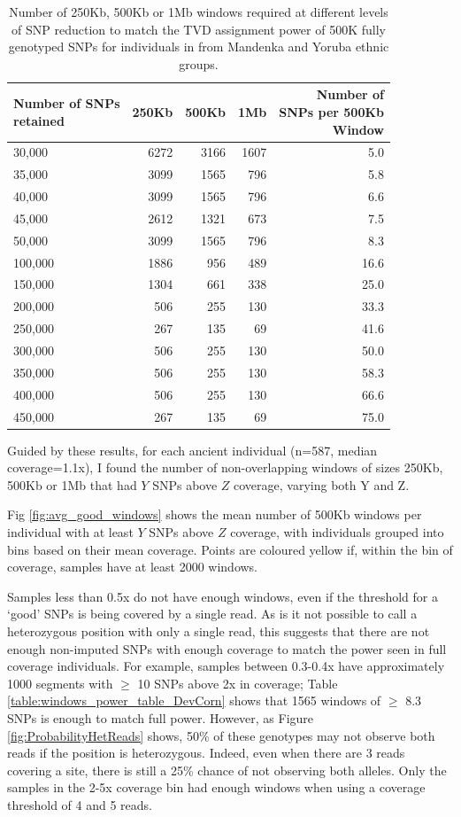 {\begin{table}
\centering
\begin{tabular}[t]{lrrrr}
\toprule
\thead{Number of SNPs\\ retained} & 250Kb & 500Kb & 1Mb & \thead{Number of\\ SNPs per 500Kb \\Window}\\
\midrule
30,000 & 6272 & 3166 & 1607 & 5.0\\
35,000 & 3099 & 1565 & 796 & 5.8\\
40,000 & 3099 & 1565 & 796 & 6.6\\
45,000 & 2612 & 1321 & 673 & 7.5\\
50,000 & 3099 & 1565 & 796 & 8.3\\
100,000 & 1886 & 956 & 489 & 16.6\\
150,000 & 1304 & 661 & 338 & 25.0\\
200,000 & 506 & 255 & 130 & 33.3\\
250,000 & 267 & 135 & 69 & 41.6\\
300,000 & 506 & 255 & 130 & 50.0\\
350,000 & 506 & 255 & 130 & 58.3\\
400,000 & 506 & 255 & 130 & 66.6\\
450,000 & 267 & 135 & 69 & 75.0\\
\bottomrule
\end{tabular}
\caption{Number of 250Kb, 500Kb or 1Mb windows required at different levels of SNP reduction to match the TVD assignment power of 500K fully genotyped SNPs for individuals in from Mandenka and Yoruba ethnic groups.}
\label{table:windows_power_table_ManYor}
\end{table}

Guided by these results, for each ancient individual (n=587, median coverage=1.1x), I found the number of non-overlapping windows of sizes 250Kb, 500Kb or 1Mb that had $Y$ SNPs above $Z$ coverage, varying both Y and Z. 

Fig \ref{fig:avg_good_windows} shows the mean number of 500Kb windows per individual with at least $Y$ SNPs above $Z$ coverage, with individuals grouped into bins based on their mean coverage. Points are coloured yellow if, within the bin of coverage, samples have at least 2000 windows.

Samples less than 0.5x do not have enough windows, even if the threshold for a `good' SNPs is being covered by a single read. As is it not possible to call a heterozygous position with only a single read, this suggests that there are not enough non-imputed SNPs with enough coverage to match the power seen in full coverage individuals. For example, samples between 0.3-0.4x have approximately 1000 segments with $\geq$ 10 SNPs above 2x in coverage; Table \ref{table:windows_power_table_DevCorn} shows that 1565 windows of $\geq$ 8.3 SNPs is enough to match full power. However, as Figure \ref{fig:ProbabilityHetReads} shows, 50\% of these genotypes may not observe both reads if the position is heterozygous. Indeed, even when there are 3 reads covering a site, there is still a 25\% chance of not observing both alleles. Only the samples in the 2-5x coverage bin had enough windows when using a coverage threshold of 4 and 5 reads. 

}
